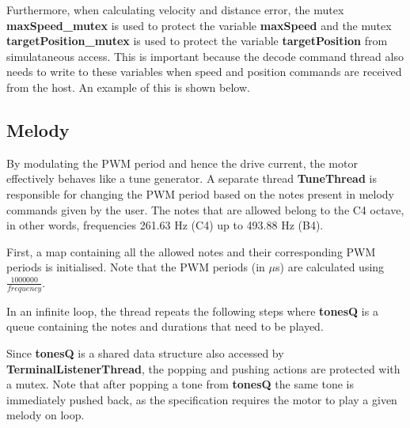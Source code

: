 \documentclass{article}
\begin{document}
\bigskip

\bigskip

\noindent
Furthermore, when calculating velocity and distance error, the mutex \textbf{maxSpeed\_mutex }is used to protect the variable \textbf{maxSpeed} and the mutex \textbf{targetPosition\_mutex} is used to protect the variable \textbf{targetPosition} from simulataneous access. This is important because the decode command thread also needs to write to these variables when speed and position commands are received from the host. An example of this is shown below.

\bigskip

\bigskip

\subsection{Melody}

\noindent
By modulating the PWM period and hence the drive current, the motor effectively behaves like a tune generator. A separate thread \textbf{TuneThread} is responsible for changing the PWM period based on the notes present in melody commands given by the user. The notes that are allowed belong to the C4 octave, in other words, frequencies 261.63 Hz (C4) up to 493.88 Hz (B4).

\bigskip

\noindent
First, a map containing all the allowed notes and their corresponding PWM periods is initialised. Note that the PWM periods (in $\mu$s) are calculated using $\frac{1000000}{frequency}$.

\bigskip



\bigskip

\noindent
In an infinite loop, the thread repeats the following steps where \textbf{tonesQ} is a queue containing the notes and durations that need to be played.

\bigskip



\bigskip

\noindent
Since \textbf{tonesQ} is a shared data structure also accessed by \textbf{TerminalListenerThread}, the popping and pushing actions are protected with a mutex. Note that after popping a tone from \textbf{tonesQ} the same tone is immediately pushed back, as the specification requires the motor to play a given melody on loop.

\bigskip
\end{document}
